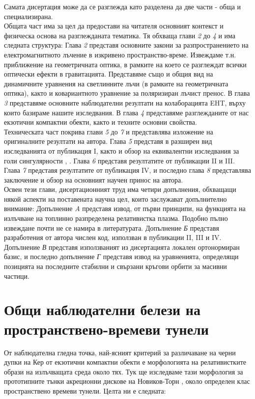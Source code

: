 \documentclass[12pt]{article}
\numberwithin{equation}{section}
\numberwithin{figure}{section}
\begin{document}
	Самата дисертация може да се разглежда като разделена да две части - обща и специализирана.\\
	
	Общата част има за цел да предостави на читателя основният контекст и физическа основа на разглежданата тематика. Тя обхваща глави \emph{2} до \emph{4} и има следната структура: Глава \emph{2} представя основните закони за разпространението на електромагнитното лъчение в изкривено пространство-време. Извеждаме т.н. приближение на геометричната оптика, в рамките на което се разглеждат всички оптически ефекти в гравитацията. Представяме също и общия вид на динамичните уравнения на светлинните лъчи (в рамките на геометричната оптика), както и ковариантното уравнение за поляризиран лъчист пренос. В глава \emph{3} представяме основните наблюдателни резултати на колаборацията EHT, върху които базираме нашите изследвания. В глава \emph{4} представяме разглежданите от нас екзотични компактни обекти, както и техните основни свойства.\\
	
	\noindent Техническата част покрива глави \emph{5} до \emph{7} и представлява изложение на оригиналните резултати на автора. Глава \emph{5} представя в разширен вид изследванията от публикация I, както и обзор на еквивалентни изследвания за голи сингулярности \cite{Gyulchev2020}, \cite{Gyulchev2021}. Глава \emph{6} представя резултатите от публикации II и III. Глава \emph{7} представя резултатите от публикация IV, и последно глава \emph{8} представлява заключение и обзор на основният научен принос на автора.\\
	
	\noindent Освен тези глави, дисертационният труд има четири допълнения, обхващащи някой аспекти на поставената научна цел, които заслужават допълнително внимание: Допълнение \emph{A} представя извод, от първи принципи, на функцията на излъчване на топлинно разпределена релативистка плазма. Подобно пълно извеждане почти не се намира в литературата. Допълнение \emph{Б} представя разработения от автора числен код, използван в публикации II, III и IV. Допълнение \emph{В} представя използваният из дисертацията локален ортонормиран базис, и последно допълнение \emph{Г} представя извод на уравненията, определящи позицията на последните стабилни и свързани кръгови орбити за масивни частици.
	
	\newpage
	
	\section{Общи наблюдателни белези на пространствено-времеви тунели}
	От наблюдателна гледна точка, най-ясният критерий за различаване на черни дупки на Кер от екзотични компактни обекти е морфологията на релативистките образи на излъчващата среда около тях. Тук ще изследваме тази морфология за прототипните тънки акреционни дискове на Новиков-Торн \cite{Page1973}, около определен клас пространствено времеви тунели. Целта ни е следната:\\
	
\end{document}
